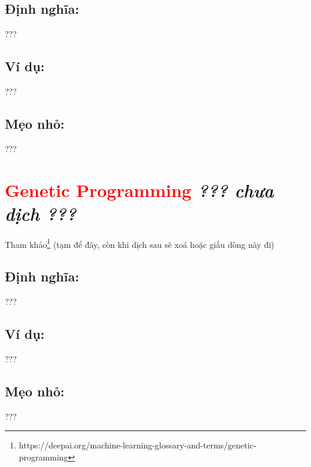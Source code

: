 \subsection*{Định nghĩa:}
???
\subsection*{Ví dụ:}
???
\subsection*{Mẹo nhỏ:}
???
\section*{\huge \textcolor{Red}{Genetic Programming}  \small \textit{??? chưa dịch ???} }
Tham khảo\footnote{https://deepai.org/machine-learning-glossary-and-terms/genetic-programming} (tạm để đây, còn khi dịch sau sẽ xoá hoặc giấu dòng này đi)
\subsection*{Định nghĩa:}
???
\subsection*{Ví dụ:}
???
\subsection*{Mẹo nhỏ:}
???
